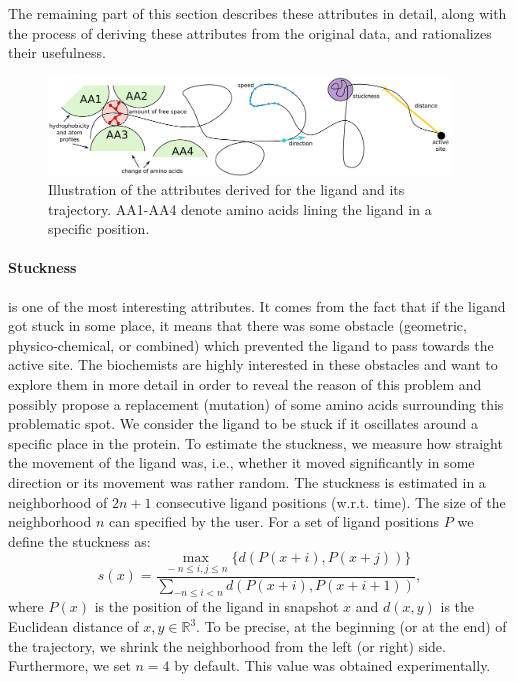 \documentclass[twocolumn]{bmcart}%
\begin{document}
The remaining part of this section describes these attributes in detail, along with the process of deriving these attributes from the original data, and rationalizes their usefulness.
    
\begin{figure}[thb]
	\centering
  \includegraphics[width=0.95\textwidth]{img/attributes.png}
  \caption{\label{fig:attributes} Illustration of the attributes derived for the ligand and its trajectory. AA1-AA4 denote amino acids lining the ligand in a specific position.}
\end{figure}

\paragraph{\textbf{Stuckness}} is one of the most interesting attributes.
It comes from the fact that if the ligand got stuck in some place, it means that there was some obstacle (geometric, physico-chemical, or combined) which prevented the ligand to pass towards the active site.
The biochemists are highly interested in these obstacles and want to explore them in more detail in order to reveal the reason of this problem and possibly propose a replacement (mutation) of some amino acids surrounding this problematic spot.
We consider the ligand to be stuck if it oscillates around a specific place in the protein. %
To estimate the stuckness, we measure how straight the movement of the ligand was, i.e., whether it moved significantly in some direction or its movement was rather random.
The stuckness is estimated in a neighborhood of $2n + 1$ consecutive ligand positions (w.r.t. time).
The size of the neighborhood $n$ can specified by the user.
For a set of ligand positions $P$ we define the stuckness as:
\begin{equation}
  s(x) = \frac{\max_{\,-n \le i, j \le n} \{ d(P(x + i), P(x + j)) \}}{\sum_{-n \le i < n}{d(P(x + i), P(x + i + 1))}},
  \label{eq:straightness}
\end{equation}
where $P(x)$ is the position of the ligand in snapshot $x$ and $d(x, y)$ is the Euclidean distance of $x, y \in \mathbb{R}^3$.
To be precise, at the beginning (or at the end) of the trajectory, we shrink the neighborhood from the left (or right) side.
Furthermore, we set $n = 4$ by default.
This value was obtained experimentally.
\end{document}
